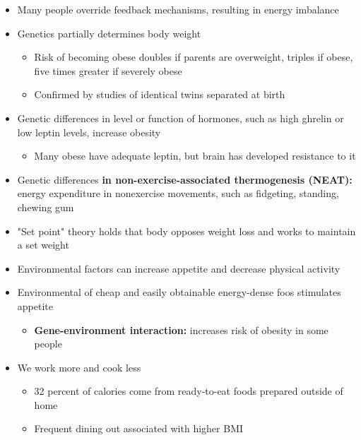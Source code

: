 \documentclass[12pt]{article}
\begin{document}
\begin{itemize}
                \item Many people override feedback mechanisms, resulting in energy imbalance
                \item Genetics partially determines body weight
                    \begin{itemize}
                        \item Risk of becoming obese doubles if parents are overweight, triples if obese, five times greater if severely obese
                        \item Confirmed by studies of identical twins separated at birth
                    \end{itemize}
                \item Genetic differences in level or function of hormones, such as high ghrelin or low leptin levels, increase obesity
                    \begin{itemize}
                        \item Many obese have adequate leptin, but brain has developed resistance to it
                    \end{itemize}
                \item Genetic differences \textbf{in non-exercise-associated thermogenesis (NEAT):} energy expenditure in nonexercise movements, such as fidgeting, standing, chewing gum
                \item "Set point" theory holds that body opposes weight loss and works to maintain a set weight
                \item Environmental factors can increase appetite and decrease physical activity
                \item Environmental of cheap and easily obtainable energy-dense foos stimulates appetite
                    \begin{itemize}
                        \item \textbf{Gene-environment interaction:} increases risk of obesity in some people
                    \end{itemize}
                \item We work more and cook less
                    \begin{itemize}
                        \item 32 percent of calories come from ready-to-eat foods prepared outside of home
                        \item Frequent dining out associated with higher BMI
                    \end{itemize}

\end{itemize}
\end{document}
